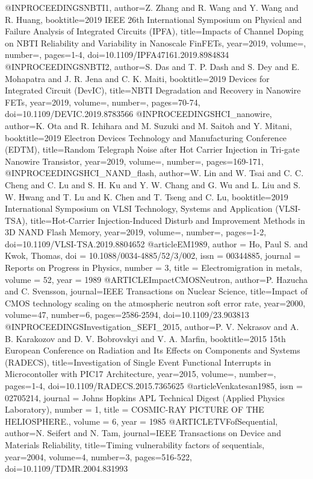 @INPROCEEDINGS{NBTI1,
	author={Z. {Zhang} and R. {Wang} and Y. {Wang} and R. {Huang}},
	booktitle={2019 IEEE 26th International Symposium on Physical and Failure Analysis of Integrated Circuits (IPFA)}, 
	title={Impacts of Channel Doping on NBTI Reliability and Variability in Nanoscale FinFETs}, 
	year={2019},
	volume={},
	number={},
	pages={1-4},	
	doi={10.1109/IPFA47161.2019.8984834}
}
@INPROCEEDINGS{NBTI2,
	author={S. {Das} and T. P. {Dash} and S. {Dey} and E. {Mohapatra} and J. R. {Jena} and C. K. {Maiti}},
	booktitle={2019 Devices for Integrated Circuit (DevIC)}, 
	title={NBTI Degradation and Recovery in Nanowire FETs}, 
	year={2019},
	volume={},
	number={},
	pages={70-74},	
	doi={10.1109/DEVIC.2019.8783566}
}
@INPROCEEDINGS{HCI_nanowire,
	author={K. {Ota} and R. {Ichihara} and M. {Suzuki} and M. {Saitoh} and Y. {Mitani}},
	booktitle={2019 Electron Devices Technology and Manufacturing Conference (EDTM)}, 
	title={Random Telegraph Noise after Hot Carrier Injection in Tri-gate Nanowire Transistor}, 
	year={2019},
	volume={},
	number={},
	pages={169-171},
}
@INPROCEEDINGS{HCI_NAND_flash,
	author={W. {Lin} and W. {Tsai} and C. C. {Cheng} and C. {Lu} and S. H. {Ku} and Y. W. {Chang} and G. {Wu} and L. {Liu} and S. W. {Hwang} and T. {Lu} and K. {Chen} and T. {Tseng} and C. {Lu}},
	booktitle={2019 International Symposium on VLSI Technology, Systems and Application (VLSI-TSA)}, 
	title={Hot-Carrier Injection-Induced Disturb and Improvement Methods in 3D NAND Flash Memory}, 
	year={2019},
	volume={},
	number={},
	pages={1-2},	
	doi={10.1109/VLSI-TSA.2019.8804652}
}
@article{EM1989,
	author = {Ho, Paul S. and Kwok, Thomas},
	doi = {10.1088/0034-4885/52/3/002},
	issn = {00344885},
	journal = {Reports on Progress in Physics},
	number = {3},
	title = {{Electromigration in metals}},
	volume = {52},
	year = {1989}
}
@ARTICLE{ImpactCMOSNeutron,
	author={P. {Hazucha} and C. {Svensson}},
	journal={IEEE Transactions on Nuclear Science}, 
	title={Impact of CMOS technology scaling on the atmospheric neutron soft error rate}, 
	year={2000},
	volume={47},
	number={6},
	pages={2586-2594},	
	doi={10.1109/23.903813}
}
@INPROCEEDINGS{Investigation_SEFI_2015,
	author={P. V. {Nekrasov} and A. B. {Karakozov} and D. V. {Bobrovskyi} and V. A. {Marfin}},
	booktitle={2015 15th European Conference on Radiation and Its Effects on Components and Systems (RADECS)}, 
	title={Investigation of Single Event Functional Interrupts in Microcontoller with PIC17 Architecture}, 
	year={2015},
	volume={},
	number={},
	pages={1-4},	
	doi={10.1109/RADECS.2015.7365625}
}
@article{Venkatesan1985,
	issn = {02705214},
	journal = {Johns Hopkins APL Technical Digest (Applied Physics Laboratory)},
	number = {1},
	title = {{COSMIC-RAY PICTURE OF THE HELIOSPHERE.}},
	volume = {6},
	year = {1985}
}
@ARTICLE{TVFofSequential,
	author={N. {Seifert} and N. {Tam}},
	journal={IEEE Transactions on Device and Materials Reliability}, 
	title={Timing vulnerability factors of sequentials}, 
	year={2004},
	volume={4},
	number={3},
	pages={516-522},
	doi={10.1109/TDMR.2004.831993}}
	
